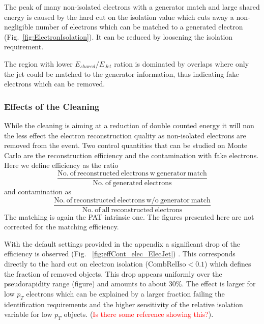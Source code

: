 \documentclass{cmspaper}
\begin{document}
The peak of many non-isolated electrons with a generator match and large shared
energy is caused by the hard cut on the isolation value which cuts away a
non-negligible number of electrons which can be matched to a generated electron
(Fig.~\ref{fig:ElectronIsolation}). It can be reduced by loosening the isolation
requirement.

The region with lower $E_{shared}/E_{Jet}$ ration is dominated by overlaps where
only the jet could be matched to the generator information, thus indicating fake
electrons which can be removed.

\clearpage

\subsubsection{Effects of the Cleaning}

While the cleaning is aiming at a reduction of double counted energy it will non
the less effect the electron reconstruction quality as non-isolated electrons are
removed from the event. Two control quantities that can be studied on Monte
Carlo are the reconstruction efficiency and the contamination with fake
electrons. Here we define efficiency as the ratio 
\[\frac{\mathrm{No.\ of\ reconstructed\ electrons\ w\ generator\ match}}{\mathrm{No.\ of\ generated\ electrons}}\]
and contamination as
\[\frac{\mathrm{No.\ of\ reconstructed\ electrons\ w/o\ generator\ match
}}{\mathrm{No.\ of\ all\ reconstructed\ electrons}}\]
The matching is again the PAT intrinsic one. The figures presented here are not
corrected for the matching efficiency.

With the default settings provided in the appendix a significant drop of the
efficiency is observed (Fig. ~\ref{fig:effCont_elec_ElecJet}) . This corresponds
directly to the hard cut on electron isolation ($\mathrm{CombRelIso}<0.1$) which defines
the fraction of removed objects. This drop appears uniformly over the
pseudorapidity range (figure) and amounts to about 30\%.  The effect is larger
for low $p_T$ electrons which can be explained by a larger fraction failing the
identification requirements and the higher sensitivity of the relative isolation
variable for low $p_T$ objects.  (\textcolor{red}{Is there some reference
showing this?}).
\end{document}
